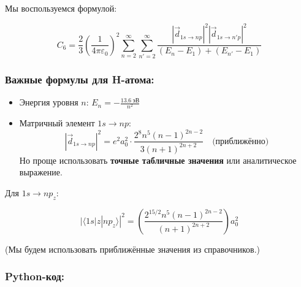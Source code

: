 \documentclass[11pt]{article}
\providecommand{\tightlist}{%
      \setlength{\itemsep}{0pt}\setlength{\parskip}{0pt}}
\begin{document}
Мы воспользуемся формулой:

\[
C_6 = \frac{2}{3} \left( \frac{1}{4\pi\varepsilon_0} \right)^2 \sum_{n=2}^{\infty} \sum_{n'=2}^{\infty} \frac{ |\vec{d}_{1s \to np}|^2 |\vec{d}_{1s \to n'p}|^2 }{ (E_n - E_1) + (E_{n'} - E_1) }
\]

\subsubsection{Важные формулы для
H-атома:}\label{ux432ux430ux436ux43dux44bux435-ux444ux43eux440ux43cux443ux43bux44b-ux434ux43bux44f-h-ux430ux442ux43eux43cux430}

\begin{itemize}
\tightlist
\item
  Энергия уровня \(n\): \(E_n = -\frac{13.6~\text{эВ}}{n^2}\)
\item
  Матричный элемент \(1s \to np\):\\
  \[
    |\vec{d}_{1s \to np}|^2 = e^2 a_0^2 \cdot \frac{2^{8} n^5 (n-1)^{2n-2}}{3 (n+1)^{2n+2}} \quad \text{(приближённо)}
    \] Но проще использовать \textbf{точные табличные значения} или
  аналитическое выражение.
\end{itemize}

Для \(1s \to np_z\):

\[
|\langle 1s| z |np_z \rangle|^2 = \left( \frac{2^{15/2} n^5 (n-1)^{2n-2}}{(n+1)^{2n+2}} \right) a_0^2
\]

(Мы будем использовать приближённые значения из справочников.)

\subsubsection{Python-код:}\label{python-ux43aux43eux434}
\end{document}
